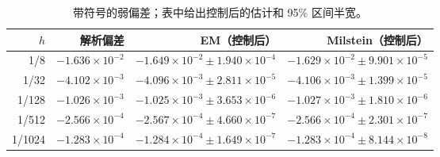 \begin{table}[H]\centering\small
\caption{带符号的弱偏差；表中给出控制后的估计和 95\% 区间半宽。}\label{tab:gbm-weak-cn}
\begin{tabular}{rrrr}\toprule
$h$ & 解析偏差 & EM（控制后） & Milstein（控制后）\\\midrule
1/8 & $-1.636\times10^{-2}$ & $-1.649\times10^{-2}\pm1.940\times10^{-4}$ & $-1.629\times10^{-2}\pm9.901\times10^{-5}$\\
1/32 & $-4.102\times10^{-3}$ & $-4.096\times10^{-3}\pm2.811\times10^{-5}$ & $-4.106\times10^{-3}\pm1.399\times10^{-5}$\\
1/128 & $-1.026\times10^{-3}$ & $-1.025\times10^{-3}\pm3.653\times10^{-6}$ & $-1.027\times10^{-3}\pm1.810\times10^{-6}$\\
1/512 & $-2.566\times10^{-4}$ & $-2.567\times10^{-4}\pm4.660\times10^{-7}$ & $-2.566\times10^{-4}\pm2.301\times10^{-7}$\\
1/1024 & $-1.283\times10^{-4}$ & $-1.284\times10^{-4}\pm1.649\times10^{-7}$ & $-1.283\times10^{-4}\pm8.144\times10^{-8}$\\
\bottomrule\end{tabular}
\end{table}
